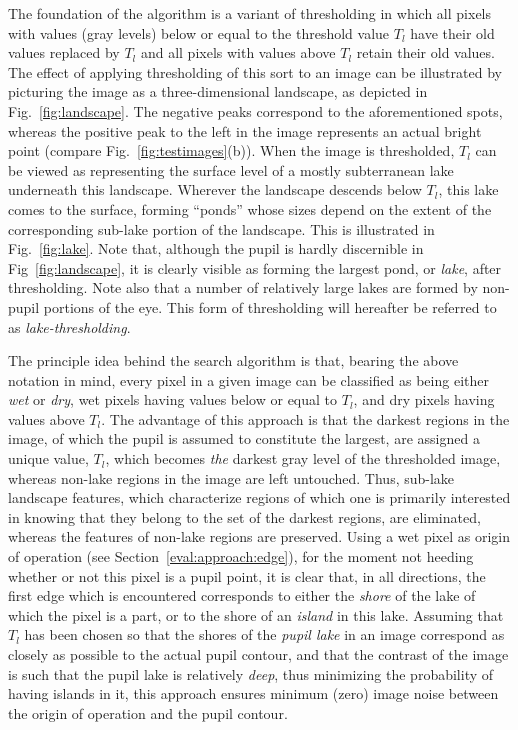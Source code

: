 The foundation of the algorithm is a variant of thresholding in which
all pixels with values (gray levels) below or equal to the threshold
value $T_{l}$ have their old values replaced by $T_{l}$ and all pixels
with values above $T_{l}$ retain their old values.  The effect of
applying thresholding of this sort to an image can be illustrated by
picturing the image as a three-dimensional landscape, as depicted in
Fig.~\ref{fig:landscape}.  The negative peaks correspond to the
aforementioned spots, whereas the positive peak to the left in the
image represents an actual bright point (compare
Fig.~\ref{fig:testimages}(b)).  When the image is thresholded, $T_{l}$
can be viewed as representing the surface level of a mostly
subterranean lake underneath this landscape.  Wherever the landscape
descends below $T_{l}$, this lake comes to the surface, forming
``ponds'' whose sizes depend on the extent of the corresponding
sub-lake portion of the landscape.  This is illustrated in
Fig.~\ref{fig:lake}.  Note that, although the pupil is hardly
discernible in Fig~\ref{fig:landscape}, it is clearly visible as
forming the largest pond, or {\em lake\/}, after thresholding.  Note
also that a number of relatively large lakes are formed by non-pupil
portions of the eye.  This form of thresholding will hereafter be
referred to as {\em lake-thresholding\/}.

The principle idea behind the search algorithm is that, bearing the
above notation in mind, every pixel in a given image can be classified
as being either {\em wet\/} or {\em dry\/}, wet pixels having values
below or equal to $T_{l}$, and dry pixels having values above $T_{l}$.
The advantage of this approach is that the darkest regions in the
image, of which the pupil is assumed to constitute the largest, are
assigned a unique value, $T_{l}$, which becomes {\em the\/} darkest
gray level of the thresholded image, whereas non-lake regions in the
image are left untouched.  Thus, sub-lake landscape features, which
characterize regions of which one is primarily interested in knowing
that they belong to the set of the darkest regions, are eliminated,
whereas the features of non-lake regions are preserved.  Using a wet
pixel as origin of operation (see Section~\ref{eval:approach:edge}),
for the moment not heeding whether or not this pixel is a pupil point,
it is clear that, in all directions, the first edge which is
encountered corresponds to either the {\em shore\/} of the lake of
which the pixel is a part, or to the shore of an {\em island\/} in
this lake.  Assuming that $T_{l}$ has been chosen so that the shores
of the {\em pupil lake\/} in an image correspond as closely as
possible to the actual pupil contour, and that the contrast of the
image is such that the pupil lake is relatively {\em deep\/}, thus
minimizing the probability of having islands in it, this approach
ensures minimum (zero) image noise between the origin of operation and
the pupil contour.

